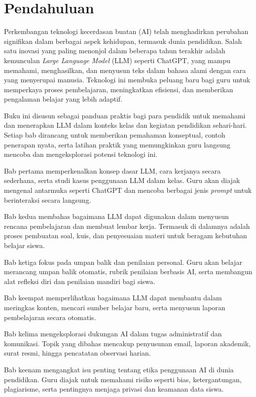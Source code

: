 \chapter{Pendahuluan}

Perkembangan teknologi kecerdasan buatan (AI) telah menghadirkan perubahan signifikan da\-lam berbagai aspek kehidupan, termasuk dunia pendidikan. Salah satu inovasi yang paling menonjol dalam beberapa tahun terakhir adalah kemunculan \textit{Large Language Model} (LLM) se\-per\-ti ChatGPT, yang mampu memahami, menghasilkan, dan menyusun teks dalam bahasa alami dengan cara yang menyerupai manusia. Teknologi ini membuka peluang baru bagi guru untuk memperkaya proses pembelajaran, meningkatkan efisiensi, dan memberikan pengalaman belajar yang lebih adaptif.

Buku ini disusun sebagai panduan praktis bagi para pendidik untuk memahami dan menerapkan LLM dalam konteks kelas dan kegiatan pendidikan sehari-hari. Setiap bab dirancang untuk memberikan pemahaman konseptual, contoh penerapan nyata, serta latihan praktik yang memungkinkan guru langsung mencoba dan mengeksplorasi potensi teknologi ini.

Bab pertama memperkenalkan konsep dasar LLM, cara kerjanya secara sederhana, serta studi kasus penggunaan LLM dalam kelas. Guru akan diajak mengenal antarmuka seperti ChatGPT dan mencoba berbagai jenis \textit{prompt} untuk berinteraksi secara langsung.

Bab kedua membahas bagaimana LLM dapat digunakan dalam menyusun rencana pembelajaran dan membuat lembar kerja. Termasuk di dalamnya adalah proses pembuatan soal, kuis, dan penyesuaian materi untuk beragam kebutuhan belajar siswa.

Bab ketiga fokus pada umpan balik dan penilaian personal. Guru akan belajar merancang umpan balik otomatis, rubrik penilaian berbasis AI, serta membangun alat refleksi diri dan penilaian mandiri bagi siswa.

Bab keempat memperlihatkan bagaimana LLM dapat membantu dalam meringkas konten, mencari sumber belajar baru, serta menyusun laporan pembelajaran secara otomatis.

Bab kelima mengeksplorasi dukungan AI dalam tugas administratif dan komunikasi. Topik yang dibahas mencakup penyusunan email, laporan akademik, surat resmi, hingga pencatatan observasi harian.

Bab keenam mengangkat isu penting tentang etika penggunaan AI di dunia pendidikan. Guru diajak untuk memahami risiko seperti bias, ketergantungan, plagiarisme, serta pentingnya menjaga privasi dan keamanan data siswa.

